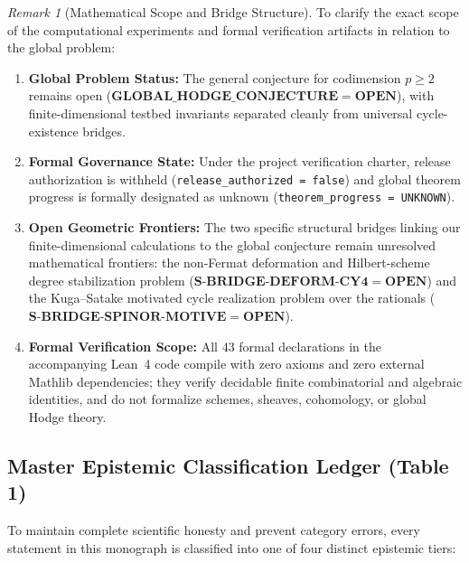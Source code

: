 \documentclass[11pt,a4paper]{article}
\theoremstyle{definition}
\theoremstyle{remark}
\newtheorem{remark}[theorem]{Remark}
\begin{document}
\begin{remark}[Mathematical Scope and Bridge Structure]
\label{rem:epistemic_invariants}
To clarify the exact scope of the computational experiments and formal verification artifacts in relation to the global problem:
\begin{enumerate}[label=(\alph*),leftmargin=2em]
\item \textbf{Global Problem Status:} The general conjecture for codimension $p \ge 2$ remains open ($\mathbf{GLOBAL\_HODGE\_CONJECTURE = OPEN}$), with finite-dimensional testbed invariants separated cleanly from universal cycle-existence bridges.
\item \textbf{Formal Governance State:} Under the project verification charter, release authorization is withheld (\texttt{release\_authorized = false}) and global theorem progress is formally designated as unknown (\texttt{theorem\_progress = UNKNOWN}).
\item \textbf{Open Geometric Frontiers:} The two specific structural bridges linking our finite-dimensional calculations to the global conjecture remain unresolved mathematical frontiers: the non-Fermat deformation and Hilbert-scheme degree stabilization problem ($\mathbf{S\text{-}BRIDGE\text{-}DEFORM\text{-}CY4 = OPEN}$) and the Kuga--Satake motivated cycle realization problem over the rationals ($\mathbf{S\text{-}BRIDGE\text{-}SPINOR\text{-}MOTIVE = OPEN}$).
\item \textbf{Formal Verification Scope:} All $43$ formal declarations in the accompanying Lean~4 code compile with zero axioms and zero external Mathlib dependencies; they verify decidable finite combinatorial and algebraic identities, and do not formalize schemes, sheaves, cohomology, or global Hodge theory.
\end{enumerate}
\end{remark}

\subsection{Master Epistemic Classification Ledger (Table 1)}
To maintain complete scientific honesty and prevent category errors, every statement in this monograph is classified into one of four distinct epistemic tiers:
\end{document}
